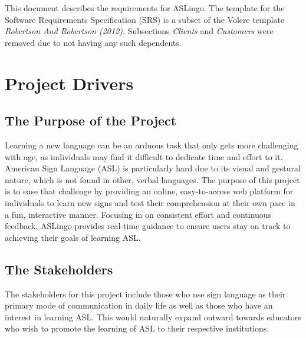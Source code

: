\documentclass[12pt, titlepage]{article}
\begin{document}
This document describes the requirements for ASLingo. The template for the Software
Requirements Specification (SRS) is a subset of the Volere
template \textit{Robertson And Robertson (2012)}.  Subsections \textit{Clients} and \textit{Customers} were removed due to not having any such dependents.

\section{Project Drivers}

\subsection{The Purpose of the Project}

Learning a new language can be an arduous task that only gets more challenging
with age, as individuals may find it difficult to dedicate time and effort to
it. American Sign Language (ASL) is particularly hard due to its visual and
gestural nature, which is not found in other, verbal languages. The purpose of this project is
to ease that challenge by providing an online, easy-to-access web platform for
individuals to learn new signs and test their comprehension at their own pace
in a fun, interactive manner. Focusing in on consistent effort and continuous
feedback, ASLingo provides real-time guidance to ensure users stay on track to
achieving their goals of learning ASL.

\subsection{The Stakeholders}

 The stakeholders for this project include those who use sign language as their primary mode of communication in daily life as well as those who have an interest in learning ASL. This would naturally expand outward towards educators who wish to promote the learning of ASL to their respective institutions. 



\end{document}
